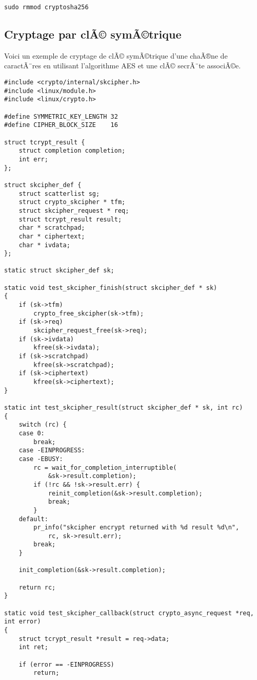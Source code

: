 \documentclass[11pt]{article}
\begin{document}
\begin{verbatim}
sudo rmmod cryptosha256
\end{verbatim}

\subsection*{Cryptage par clÃ© symÃ©trique}
\label{sec-16-2}

Voici un exemple de cryptage de clÃ© symÃ©trique d'une chaÃ®ne de caractÃ¨res en utilisant l'algorithme AES et une clÃ© secrÃ¨te associÃ©e.

\begin{verbatim}
#include <crypto/internal/skcipher.h>
#include <linux/module.h>
#include <linux/crypto.h>

#define SYMMETRIC_KEY_LENGTH 32
#define CIPHER_BLOCK_SIZE    16

struct tcrypt_result {
    struct completion completion;
    int err;
};

struct skcipher_def {
    struct scatterlist sg;
    struct crypto_skcipher * tfm;
    struct skcipher_request * req;
    struct tcrypt_result result;
    char * scratchpad;
    char * ciphertext;
    char * ivdata;
};

static struct skcipher_def sk;

static void test_skcipher_finish(struct skcipher_def * sk)
{
    if (sk->tfm)
        crypto_free_skcipher(sk->tfm);
    if (sk->req)
        skcipher_request_free(sk->req);
    if (sk->ivdata)
        kfree(sk->ivdata);
    if (sk->scratchpad)
        kfree(sk->scratchpad);
    if (sk->ciphertext)
        kfree(sk->ciphertext);
}

static int test_skcipher_result(struct skcipher_def * sk, int rc)
{
    switch (rc) {
    case 0:
        break;
    case -EINPROGRESS:
    case -EBUSY:
        rc = wait_for_completion_interruptible(
            &sk->result.completion);
        if (!rc && !sk->result.err) {
            reinit_completion(&sk->result.completion);
            break;
        }
    default:
        pr_info("skcipher encrypt returned with %d result %d\n",
            rc, sk->result.err);
        break;
    }

    init_completion(&sk->result.completion);

    return rc;
}

static void test_skcipher_callback(struct crypto_async_request *req, int error)
{
    struct tcrypt_result *result = req->data;
    int ret;

    if (error == -EINPROGRESS)
        return;


\end{verbatim}
\end{document}
